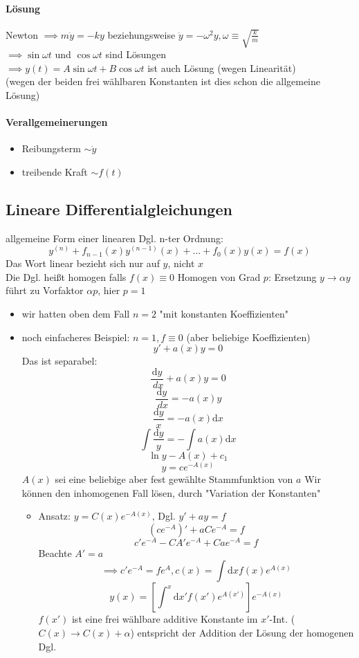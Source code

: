 \documentclass[a4paper]{scrartcl}
\renewcommand{\d}{\mathrm{d}}
\newcommand{\dd}[2]{\frac{\d #1}{\ d#2}}
\theoremstyle{definition}
\theoremstyle{plain}
\theoremstyle{remark}
\theoremstyle{remark}
\begin{document}
\paragraph{Lösung}
\label{sec-3-5-1-2}
Newton $\implies m\ddot{y} = -ky$ beziehungsweise $\ddot{y} = -\omega^2 y,\omega\equiv\sqrt{\frac{k}{m}}$ \\
         $\implies \sin{\omega t}$ und $\cos{\omega t}$ sind Lösungen \\
         $\implies y(t) = A\sin{\omega t} + B\cos{\omega t}$ ist auch Lösung (wegen Linearität) \\
         (wegen der beiden frei wählbaren Konstanten ist dies schon die allgemeine Lösung)
\paragraph{Verallgemeinerungen}
\label{sec-3-5-1-3}
\begin{itemize}
\item Reibungsterm $\sim \dot{y}$
\item treibende Kraft $\sim f(t)$
\end{itemize}
\subsection{Lineare Differentialgleichungen}
\label{sec-3-6}
allgemeine Form einer linearen Dgl. n-ter Ordnung:
\[y^{(n)} + f_{n -1}(x)y^{(n - 1)}(x) + \ldots + f_0(x)y(x) = f(x)\]
Das Wort linear bezieht sich nur auf $y$, nicht $x$ \\
   Die Dgl. heißt homogen falls $f(x)\equiv 0$
Homogen von Grad $p$: Ersetzung $y\to\alpha y$ führt zu Vorfaktor $\alpha p$, hier $p = 1$
\begin{itemize}
\item wir hatten oben dem Fall $n = 2$ "mit konstanten Koeffizienten"
\item noch einfacheres Beispiel: $n = 1, f\equiv 0$ (aber beliebige Koeffizienten)
\[y' + a(x)y = 0\]
Das ist separabel:
\[\dd{y}{x} + a(x) y = 0\]
\[\dd{y}{x} = -a(x) y\]
\[\frac{\d y}{x} = -a(x) \d x\]
\[\int\frac{\d y}{y} = - \int a(x)\d x\]
\[\ln{y} - A(x) + c_1\]
\[y = c e^{-A(x)}\]
$A(x)$ sei eine beliebige aber fest gewählte Stammfunktion von $a$
Wir können den inhomogenen Fall lösen, durch "Variation der Konstanten"
\begin{itemize}
\item Ansatz: $y = C(x)e^{-A(x)}$, Dgl. $y' + ay = f$
           \[(c e^{-A})' + a C e^{-A} = f\]
           \[c' e^{-A} - C A' e^{-A} + C a e^{-A} = f\]
           Beachte $A' = a$
           \[\implies c'e^{-A} = f e^{A},c(x) = \int\d x f(x) e^{A(x)}\]
           \[y(x) = \left[\int^x\d x' f(x') e^{A(x')}\right] e^{-A(x)}\]
           $f(x')$ ist eine frei wählbare additive Konstante im $x'$-Int. ($C(x)\to C(x) +\alpha$) entspricht der Addition der Lösung der homogenen Dgl.
\end{itemize}
\end{itemize}
\end{document}
